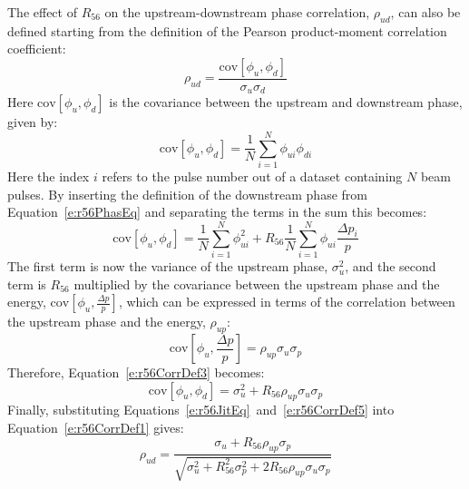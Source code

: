 The effect of \(R_{56}\) on the upstream-downstream phase correlation, \(\rho_{ud}\), can also be defined starting from the definition of the Pearson product-moment correlation coefficient:
\begin{equation}
\rho_{ud} = \frac{\mathrm{cov}\left[\phi_u,\phi_d\right]}{\sigma_u\sigma_d}
\label{e:r56CorrDef1}
\end{equation}
Here \(\mathrm{cov}\left[\phi_u,\phi_d\right]\) is the covariance between the upstream and downstream phase, given by:
\begin{equation}
 \mathrm{cov}\left[\phi_u,\phi_d\right] = \frac{1}{N} \sum_{i=1}^{N}\phi_{ui}\phi_{di}
\label{e:r56CorrDef2}
\end{equation} 
Here the index \(i\) refers to the pulse number out of a dataset containing \(N\) beam pulses. By inserting the definition of the downstream phase from Equation~\ref{e:r56PhasEq} and separating the terms in the sum this becomes:
\begin{equation}
\mathrm{cov}\left[\phi_u,\phi_d\right] = \frac{1}{N} \sum_{i=1}^{N}\phi_{ui}^{2} + R_{56}\frac{1}{N} \sum_{i=1}^{N}\phi_{ui}\frac{\Delta p_i}{p}
\label{e:r56CorrDef3}
\end{equation}
The first term is now the variance of the upstream phase, \(\sigma_u^2\), and the second term is \(R_{56}\) multiplied by the covariance between the upstream phase and the energy, \(\mathrm{cov}\left[\phi_u,\frac{\Delta p}{p}\right]\), which can be expressed in terms of the correlation between the upstream phase and the energy, \(\rho_{up}\):
\begin{equation}
\mathrm{cov}\left[\phi_u,\frac{\Delta p}{p}\right] = \rho_{up}\sigma_u\sigma_{p}
\label{e:r56CorrDef4}
\end{equation}
Therefore, Equation~\ref{e:r56CorrDef3} becomes:
\begin{equation}
\mathrm{cov}\left[\phi_u,\phi_d\right] = \sigma_u^2 + R_{56}\rho_{up}\sigma_u\sigma_p
\label{e:r56CorrDef5}
\end{equation}
Finally, substituting Equations~\ref{e:r56JitEq}~and~\ref{e:r56CorrDef5} into Equation~\ref{e:r56CorrDef1} gives:
\begin{equation}
\rho_{ud} = \frac{\sigma_u + R_{56}\rho_{up}\sigma_p}{\sqrt{\sigma_u^2 + R_{56}^2\sigma_{p}^2 + 2R_{56}\rho_{up}\sigma_{u}\sigma_{p}}}
\label{e:r56CorrDefFinal}
\end{equation}

